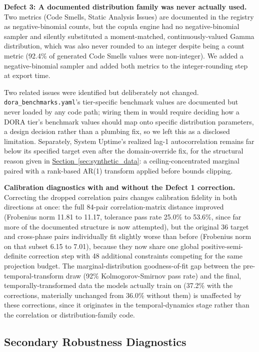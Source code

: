 \documentclass[technologies,article,submit,pdftex,moreauthors]{Definitions/mdpi}
\begin{document}
\textbf{Defect 3: A documented distribution family was never actually used.} Two metrics (Code Smells, Static Analysis Issues) are documented in the registry as negative-binomial counts, but the copula engine had no negative-binomial sampler and silently substituted a moment-matched, continuously-valued Gamma distribution, which was also never rounded to an integer despite being a count metric (92.4\% of generated Code Smells values were non-integer). We added a negative-binomial sampler and added both metrics to the integer-rounding step at export time.

{\sloppy Two related issues were identified but deliberately not changed. \texttt{dora\_benchmarks.yaml}'s tier-specific benchmark values are documented but never loaded by any code path; wiring them in would require deciding how a DORA tier's benchmark values should map onto specific distribution parameters, a design decision rather than a plumbing fix, so we left this as a disclosed limitation. Separately, System Uptime's realized lag-1 autocorrelation remains far below its specified target even after the domain-override fix, for the structural reason given in \hyperref[sec:synthetic_data]{Section~\ref*{sec:synthetic_data}}: a ceiling-concentrated marginal paired with a rank-based AR(1) transform applied before bounds clipping.\par}

\textbf{Calibration diagnostics with and without the Defect 1 correction.} Correcting the dropped correlation pairs changes calibration fidelity in both directions at once: the full 84-pair correlation-matrix distance improved (Frobenius norm 11.81 to 11.17, tolerance pass rate 25.0\% to 53.6\%, since far more of the documented structure is now attempted), but the original 36 target and cross-phase pairs individually fit slightly worse than before (Frobenius norm on that subset 6.15 to 7.01), because they now share one global positive-semi-definite correction step with 48 additional constraints competing for the same projection budget. The marginal-distribution goodness-of-fit gap between the pre-temporal-transform draw (92\% Kolmogorov-Smirnov pass rate) and the final, temporally-transformed data the models actually train on (37.2\% with the corrections, materially unchanged from 36.0\% without them) is unaffected by these corrections, since it originates in the temporal-dynamics stage rather than the correlation or distribution-family code.

\subsection{Secondary Robustness Diagnostics}\label{sec:supp_diagnostics}
\end{document}
